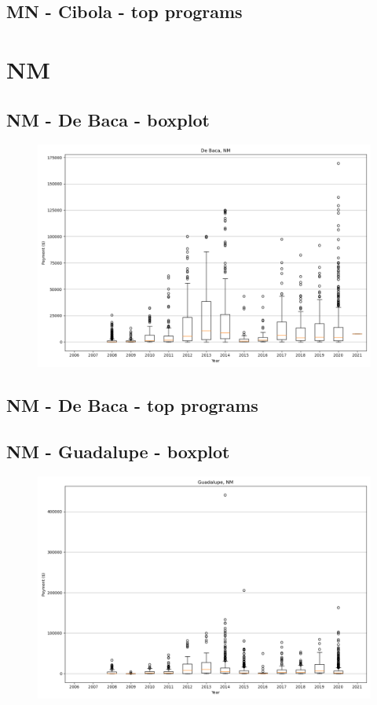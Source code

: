 \subsection*{MN - Cibola - top programs}

\newpage
\section*{NM}
\subsection*{NM - De Baca - boxplot}
\begin{figure}[h]
\centering
\includegraphics[width=7in]{../output/boxplots/counties/De Baca-NM_boxplot.png}
\end{figure}


\subsection*{NM - De Baca - top programs}

\newpage
\subsection*{NM - Guadalupe - boxplot}
\begin{figure}[h]
\centering
\includegraphics[width=7in]{../output/boxplots/counties/Guadalupe-NM_boxplot.png}
\end{figure}


